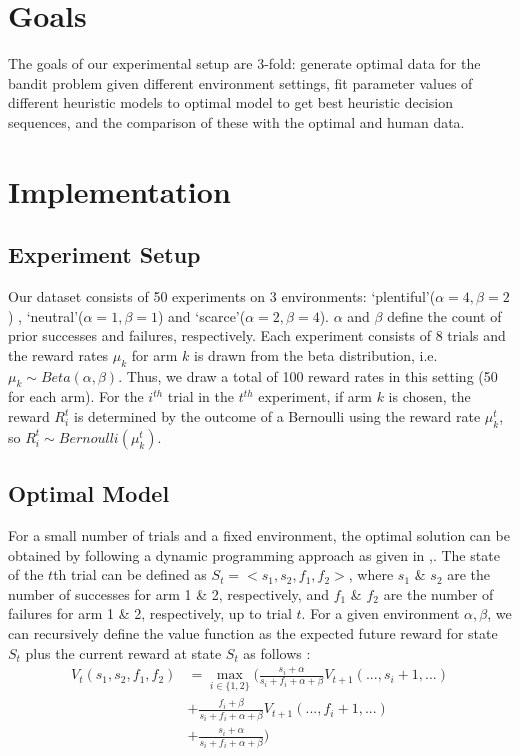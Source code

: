 \section{Goals}
The goals of our experimental setup are 3-fold: generate optimal data for the bandit problem given different environment settings, fit parameter values of different heuristic models to optimal model to get best heuristic decision sequences, and the comparison of these with the optimal and human data.

\section{Implementation}
\subsection{Experiment Setup}
Our dataset \cite{data} consists of 50 experiments on 3 environments: ‘plentiful’($\alpha=4,\beta=2$) , ‘neutral’($\alpha=1,\beta=1$) and ‘scarce’($\alpha=2,\beta=4$). $\alpha$ and $\beta$ define the count of prior successes and failures, respectively. Each experiment consists of 8 trials and the reward rates $\mu_k$ for arm $k$ is drawn from the beta distribution, i.e. $\mu_k \sim Beta (\alpha, \beta)$. Thus, we draw a total of 100 reward rates in this setting (50 for each arm). For the $i^{th}$ trial in the $t^{th}$ experiment, if arm $k$ is chosen, the reward $R_i^t$ is determined by the outcome of a Bernoulli using the reward rate $\mu_k^t$, so $R_i^t \sim Bernoulli (\mu_k^t)$.

\subsection{Optimal Model}
For a small number of trials and a fixed environment, the optimal solution can be obtained by following a dynamic programming approach as given in \cite{kaelbling},\cite{steyvers}. The state of the $t$th trial can be defined as $S_t = <s_1,s_2,f_1,f_2>$, where $s_1$ \& $s_2$ are the number of successes for arm 1 \& 2, respectively, and $f_1$ \& $f_2$ are the number of failures for arm 1 \& 2, respectively, up to trial $t$. For a given environment $\alpha,\beta$, we can recursively define the value function as the expected future reward for state $S_t$ plus the current reward at state $S_t$ as follows : 
\begin{align*}
	V_t(s_1,s_2,f_1,f_2) &= \max_{i \in \{1,2\}} 
	\Big(
	\frac{s_i + \alpha}{s_i + f_i + \alpha + \beta} V_{t+1}(...,s_i+1,...) \\
	&+ \frac{f_i + \beta}{s_i + f_i + \alpha + \beta} V_{t+1}(...,f_i+1,...)\\
	&+ \frac{s_i + \alpha}{s_i + f_i + \alpha + \beta} 
	\Big)	
\end{align*}


